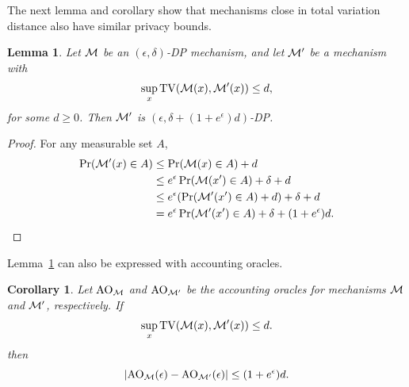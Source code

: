 \documentclass{article}
\theoremstyle{plain}
\newtheorem{lemma}[theorem]{Lemma}
\newtheorem{corollary}[theorem]{Corollary}
\theoremstyle{definition}
\theoremstyle{remark}
\begin{document}
The next lemma and corollary show that mechanisms close in total variation 
distance also have similar privacy bounds.
\begin{lemma}\label{lemma:dp-total-variation-distance-bound}
    Let $\mathcal{M}$ be an $(\epsilon, \delta)$-DP mechanism, and let 
    $\mathcal{M}'$ be a mechanism with 
    \begin{equation}
        \sup_x \mathrm{TV}(\mathcal{M}(x), \mathcal{M}'(x)) \leq d,
    \end{equation}
    for some $d \geq 0$.
    Then $\mathcal{M}'$ is $(\epsilon, \delta + (1 + e^\epsilon)d)$-DP.
\end{lemma}
\begin{proof}
    For any measurable set $A$,
    \begin{equation}
        \begin{split}
            \Pr(\mathcal{M}'(x) \in A) 
            &\leq \Pr(\mathcal{M}(x) \in A) + d
            \\&\leq e^\epsilon\Pr(\mathcal{M}(x') \in A) + \delta + d
            \\&\leq e^\epsilon(\Pr(\mathcal{M}'(x') \in A) + d) + \delta + d
            \\&= e^\epsilon\Pr(\mathcal{M}'(x') \in A) + \delta 
            + (1 + e^\epsilon)d.
        \end{split}
    \end{equation}
\end{proof}
Lemma~\ref{lemma:dp-total-variation-distance-bound} can also be expressed with 
accounting oracles.
\begin{corollary}\label{corollary:ao-total-variation-distance-bound}
    Let $\mathrm{AO}_{\mathcal{M}}$ and $\mathrm{AO}_{\mathcal{M}'}$ be the accounting oracles for mechanisms
    $\mathcal{M}$ and $\mathcal{M}'$, respectively. If 
    \begin{equation}
        \sup_x \mathrm{TV}(\mathcal{M}(x), \mathcal{M}'(x)) \leq d.
    \end{equation}
    then
    \begin{equation}
        |\mathrm{AO}_{\mathcal{M}}(\epsilon) - \mathrm{AO}_{\mathcal{M}'}(\epsilon)| \leq (1 + e^\epsilon)d.
    \end{equation}
\end{corollary}
\end{document}
